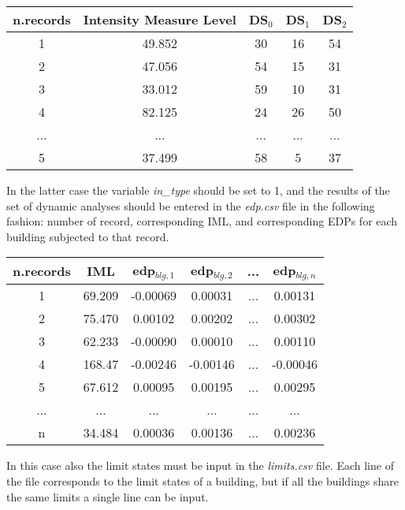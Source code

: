 \begin{table}[h]
\centering
\begin{tabular}{|c|c|c|c|c|} \hline
\textbf{n.records} & \textbf{Intensity Measure Level} & \textbf{DS$_0$} & \textbf{DS$_1$} & \textbf{DS$_2$} \\ \hline
1 & 49.852 &	30 &	16 &	54\\ \hline
2 & 47.056 &	54 &	15 &	31\\ \hline
3 & 33.012 &	59 &	10 &	31\\ \hline
4 & 82.125 &	24 &	26 &	50\\ \hline
... & ... & ... & ... & ... \\ \hline
5 & 37.499 &	58 &	5 &	37\\ \hline
\end{tabular}
\end{table}

In the latter case the variable \textit{in\_type} should be set to 1, and the results of the set of dynamic analyses should be entered in the \textit{edp.csv} file in the following fashion: number of record, corresponding IML, and corresponding EDPs for each building subjected to that record.

\begin{table}[h]
\centering
\begin{tabular}{|c|c|c|c|c|c|} \hline
\textbf{n.records} & \textbf{IML} & \textbf{edp$_{blg,1}$} & \textbf{edp$_{blg,2}$} & \textbf{...} & \textbf{edp$_{blg,n}$} \\ \hline
1 &	69.209 &	-0.00069 &	0.00031 & ... &	0.00131\\ \hline
2 &	75.470 &	0.00102 & 	0.00202 & ... &	0.00302\\ \hline
3 &	62.233 &	-0.00090 &	0.00010 & ... &	0.00110\\ \hline
4 &	168.47 &	-0.00246 &	-0.00146 & ... &	-0.00046\\ \hline
5 &	67.612 &	0.00095 & 	0.00195 & ... &	0.00295\\ \hline
... & ... & ... & ... & ... & ...\\ \hline
n &	34.484 &	0.00036 & 	0.00136 & ... & 	0.00236\\ \hline
\end{tabular}
\end{table}

In this case also the limit states must be input in the \textit{limits.csv} file. Each line of the file corresponds to the limit states of a building, but if all the buildings share the same limits a single line can be input.


